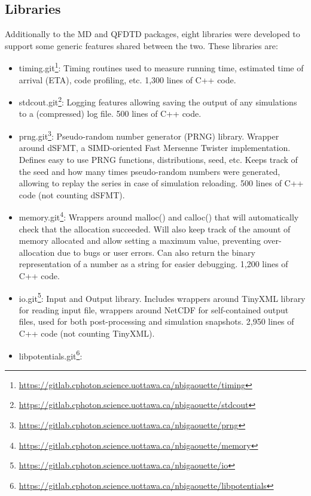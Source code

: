 \subsection{Libraries}
\label{section:tools:libraries}

Additionally to the MD and QFDTD packages, eight libraries were developed to
support some generic features shared between the two. These libraries are:
\begin{itemize}
\item timing.git\footnote{ \url{
    https://gitlab.cphoton.science.uottawa.ca/nbigaouette/timing}}:
    Timing routines used to measure running time, estimated time of arrival
    (ETA), code profiling, etc. 1,300 lines of C++ code.
\item stdcout.git\footnote{ \url{
    https://gitlab.cphoton.science.uottawa.ca/nbigaouette/stdcout}}:
    Logging features allowing saving the output of any simulations to a
    (compressed) log file. 500 lines of C++ code.
\item prng.git\footnote{ \url{
    https://gitlab.cphoton.science.uottawa.ca/nbigaouette/prng}}:
    Pseudo-random number generator (PRNG) library. Wrapper around
    dSFMT\cite{prng2009}, a SIMD-oriented Fast Mersenne Twister implementation.
    Defines easy to use PRNG functions, distributions, seed, etc. Keeps track of
    the seed and how many times pseudo-random numbers were generated, allowing
    to replay the series in case of simulation reloading. 500 lines of C++ code
    (not counting dSFMT).
\item memory.git\footnote{ \url{
    https://gitlab.cphoton.science.uottawa.ca/nbigaouette/memory}}:
    Wrappers around malloc() and calloc() that will automatically check that
    the allocation succeeded. Will also keep track of the amount of
    memory allocated and allow setting a maximum value, preventing
    over-allocation due to bugs or user errors. Can also return the binary
    representation of a number as a string for easier debugging. 1,200 lines of
    C++ code.
\item io.git\footnote{ \url{
    https://gitlab.cphoton.science.uottawa.ca/nbigaouette/io}}:
    Input and Output library. Includes wrappers around TinyXML library\cite{tinyxml} for
    reading input file, wrappers around NetCDF\cite{netcdf} for self-contained
    output files, used for both post-processing and simulation snapshots.
    2,950 lines of C++ code (not counting TinyXML).
\item libpotentials.git\footnote{ \url{
    https://gitlab.cphoton.science.uottawa.ca/nbigaouette/libpotentials}}:

\end{itemize}
